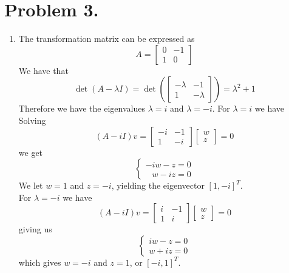 \documentclass[a4paper,11pt,norsk]{article}
\begin{document}
\section*{Problem 3.}
\begin{enumerate}
    \item The transformation matrix can be expressed as
        \[
            A = \begin{bmatrix}
                    0 & -1 \\
                    1 &  0
                \end{bmatrix}
        \]
        We have that 
        \[
            \det(A - \lambda I) = \det\left(
                \begin{bmatrix}
                    -\lambda & -1        \\
                    1        & -\lambda
                \end{bmatrix}
            \right) = \lambda^2 + 1
        \]
        Therefore we have the eigenvalues $\lambda = i$ and $\lambda = -i$. For $\lambda = i$ we have
        Solving 
        \[
            (A - iI)v = \begin{bmatrix} -i & -1 \\ 1 & -i \end{bmatrix} \begin{bmatrix} w \\ z \end{bmatrix} = 0
        \]
        we get 
        \[
            \begin{cases}
                -i w - z = 0 \\
                \:\:\,\,w - iz   = 0
            \end{cases}
        \]
        We let $w = 1$ and $z = -i$, yielding the eigenvector $[1, -i]^{T}$. \\
        For $\lambda = -i$ we have 
        \[
            (A - iI)v = \begin{bmatrix} i & -1 \\ 1 & i \end{bmatrix} \begin{bmatrix} w \\ z \end{bmatrix} = 0
        \]
        giving us
        \[
            \begin{cases}
                i w - z = 0 \\
                w + iz  = 0
            \end{cases}
        \]
        which gives $w = -i$ and $z = 1$, or $[-i, 1]^T$.
        

\end{enumerate}
\end{document}
